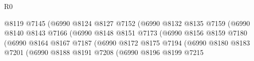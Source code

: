 \begin{lexlean}{R0}
\begin{coremodule}
                                              @8119
                                              @7145
                                              (@6990
                                                @8124
                                                @8127
                                                @7152
                                                (@6990
                                                  @8132
                                                  @8135
                                                  @7159
                                                  (@6990
                                                    @8140
                                                    @8143
                                                    @7166
                                                    (@6990
                                                      @8148
                                                      @8151
                                                      @7173
                                                      (@6990
                                                        @8156
                                                        @8159
                                                        @7180
                                                        (@6990
                                                          @8164
                                                          @8167
                                                          @7187
                                                          (@6990
                                                            @8172
                                                            @8175
                                                            @7194
                                                            (@6990
                                                              @8180
                                                              @8183
                                                              @7201
                                                              (@6990
                                                                @8188
                                                                @8191
                                                                @7208
                                                                (@6990
                                                                  @8196
                                                                  @8199
                                                                  @7215

\end{coremodule}
\end{lexlean}

